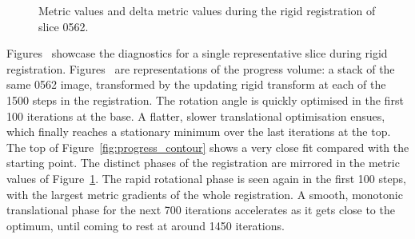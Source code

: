   \begin{figure}[p]
    \centering
    \caption{Metric values and delta metric values during the rigid registration of slice 0562.}
    \label{fig:0562_correlation}
  \end{figure}
	
	Figures~ showcase the diagnostics for a single representative slice during rigid registration. Figures~ are representations of the progress volume: a stack of the same 0562 image, transformed by the updating rigid transform at each of the 1500 steps in the registration. The rotation angle is quickly optimised in the first 100 iterations at the base. A flatter, slower translational optimisation ensues, which finally reaches a stationary minimum over the last iterations at the top. The top of Figure~\ref{fig:progress_contour} shows a very close fit compared with the starting point. The distinct phases of the registration are mirrored in the metric values of Figure~\ref{fig:0562_correlation}. The rapid rotational phase is seen again in the first 100 steps, with the largest metric gradients of the whole registration. A smooth, monotonic translational phase for the next 700 iterations accelerates as it gets close to the optimum, until coming to rest at around 1450 iterations.
	
